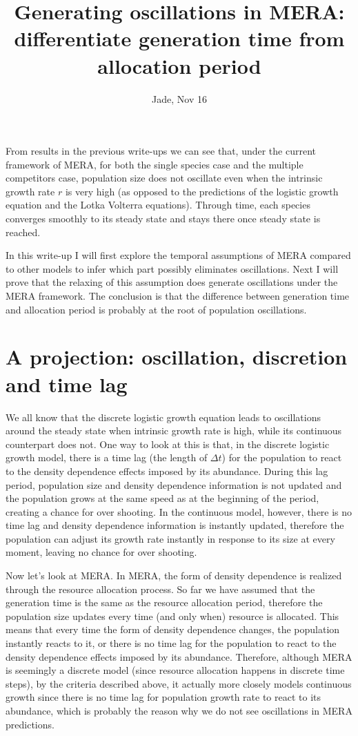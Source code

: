 \documentclass[12pt]{article}
\date{}
\title{\Large \textbf{Generating oscillations in MERA: differentiate generation time from allocation period}}
\author{Jade, Nov 16}
\begin{document}
\maketitle
\raggedright
\large
\setlength{\parindent}{15pt}

From results in the previous write-ups we can see that, under the current framework of MERA, for both the single species case and the multiple competitors case, population size does not oscillate even when the intrinsic growth rate $r$ is very high (as opposed to the predictions of the logistic growth equation and the Lotka Volterra equations). Through time, each species converges smoothly to its steady state and stays there once steady state is reached. 

In this write-up I will first explore the temporal assumptions of MERA compared to other models to infer which part possibly eliminates oscillations. Next I will prove that the relaxing of this assumption does generate oscillations under the MERA framework. The conclusion is that the difference between generation time and allocation period is probably at the root of population oscillations.

\section{A projection: oscillation, discretion and time lag}

We all know that the discrete logistic growth equation leads to oscillations around the steady state when intrinsic growth rate is high, while its continuous counterpart does not. One way to look at this is that, in the discrete logistic growth model, there is a time lag (the length of $\Delta t$) for the population to react to the density dependence effects imposed by its abundance. During this lag period, population size and density dependence information is not updated and the population grows at the same speed as at the beginning of the period, creating a chance for over shooting. In the continuous model, however, there is no time lag and density dependence information is instantly updated, therefore the population can adjust its growth rate instantly in response to its size at every moment, leaving no chance for over shooting. 

Now let's look at MERA. In MERA, the form of density dependence is realized through the resource allocation process. So far we have assumed that the generation time is the same as the resource allocation period, therefore the population size updates every time (and only when) resource is allocated. This means that every time the form of density dependence changes, the population instantly reacts to it, or there is no time lag for the population to react to the density dependence effects imposed by its abundance. Therefore, although MERA is seemingly a discrete model (since resource allocation happens in discrete time steps), by the criteria described above, it actually more closely models continuous growth since there is no time lag for population growth rate to react to its abundance, which is probably the reason why we do not see oscillations in MERA predictions. 
\end{document}
